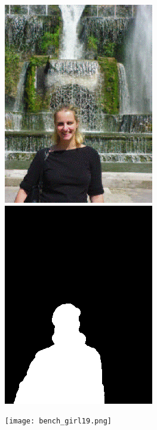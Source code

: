\documentclass[a4paper, 10pt]{article}
\begin{document}
\begin{figure}[H]
\begin{minipage}{.4\textwidth}
\centering
\includegraphics[scale=0.3]{images/girl.png}
\end{minipage}%
\begin{minipage}{.4\textwidth}
\centering
\includegraphics[scale=0.3]{images/girl_mask.png}
\end{minipage}%
\begin{minipage}{.4\textwidth}
\centering
\texttt{[image: bench\_girl19.png]}
\end{minipage}%
\end{figure}
\end{document}
